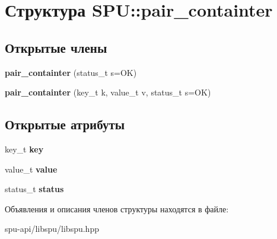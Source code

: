 \hypertarget{struct_s_p_u_1_1pair__containter}{}\section{Структура S\+PU\+:\+:pair\+\_\+containter}
\label{struct_s_p_u_1_1pair__containter}
\subsection*{Открытые члены}
\begin{DoxyCompactItemize}
\item 
\mbox{\label{struct_s_p_u_1_1pair__containter_adaa4f6c61df567548cb2945d6e341870}} 
{\bfseries pair\+\_\+containter} (status\+\_\+t s=OK)
\item 
\mbox{\label{struct_s_p_u_1_1pair__containter_ab5d1bc9e947e656fc92a42f89cf9c120}} 
{\bfseries pair\+\_\+containter} (key\+\_\+t k, value\+\_\+t v, status\+\_\+t s=OK)
\end{DoxyCompactItemize}
\subsection*{Открытые атрибуты}
\begin{DoxyCompactItemize}
\item 
\mbox{\label{struct_s_p_u_1_1pair__containter_a41255a221fcdd8698049f3611429e4ab}} 
key\+\_\+t {\bfseries key}
\item 
\mbox{\label{struct_s_p_u_1_1pair__containter_a0cc58ad72ca3b9edad95ca16a3ca6768}} 
value\+\_\+t {\bfseries value}
\item 
\mbox{\label{struct_s_p_u_1_1pair__containter_ab9cf75260b1517d4d3ea1e52853bf9a7}} 
status\+\_\+t {\bfseries status}
\end{DoxyCompactItemize}


Объявления и описания членов структуры находятся в файле\+:\begin{DoxyCompactItemize}
\item 
spu-\/api/libspu/libspu.\+hpp\end{DoxyCompactItemize}
